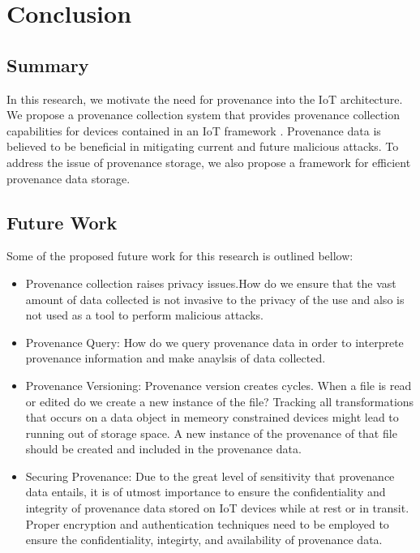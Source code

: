 
\chapter{Conclusion}

\section{Summary}
In this research, we motivate the need for provenance into the IoT architecture. We propose a provenance collection system that provides provenance collection capabilities for devices contained in an IoT framework . Provenance data is believed to be beneficial in mitigating current and future malicious attacks. To address the issue of provenance storage, we also propose a framework for efficient provenance data storage.

\section{Future Work}

Some of the proposed future work for this research is outlined bellow:
\begin{itemize}

\item Provenance collection raises privacy issues.How do we ensure that the vast amount of data collected is not invasive to the privacy of the use and also is not used as a tool to perform malicious attacks.

\item Provenance Query: How do we query provenance data in order to interprete provenance information and make anaylsis of data collected.

\item Provenance Versioning: Provenance version creates cycles. When a file is read or edited do we create a new instance of the file? Tracking all transformations that occurs on a data object in memeory constrained devices might lead to running out of storage space. A new instance of the provenance of that file should be created and included in the provenance data.

\item Securing Provenance: Due to the great level of sensitivity that  provenance data entails, it is of utmost importance to ensure the confidentiality and integrity of provenance data stored on IoT devices while at rest or in transit. Proper encryption and authentication techniques need to be employed to ensure the confidentiality, integirty, and availability of provenance data.

\end{itemize}

